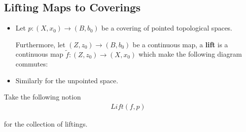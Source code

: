 \documentclass[Total.tex]{subfiles}
\begin{document}
			\subsection{Lifting Maps to Coverings}
			\begin{Def}
				\begin{itemize}
					\item 
					Let $p:(X,x_0)\rightarrow (B,b_0)$ be a covering of pointed topological spaces.
					
					Furthermore, let $(Z,z_0)\rightarrow (B,b_0)$ be a continuous map, a \textbf{lift} is a continuous map $\tilde{f}:(Z,z_0)\rightarrow (X,x_0)$ which make the following diagram commutes:
					\begin{center}
					\end{center}
					\item Similarly for the unpointed space.
				\end{itemize}
			\end{Def}
			
			Take the following notion 
			\begin{gather*}
				Lift(f,p)
			\end{gather*}
			
			for the collection of liftings.
			
\end{document}
